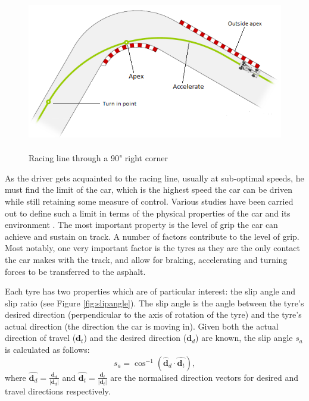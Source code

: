 \begin{figure}[!htb]
	\centering
	\includegraphics[height=7cm]{images/cornerraceline}
	\caption{Racing line through a 90" right corner}
	\label{fig:CornerRaceLine}
\end{figure}

As the driver gets acquainted to the racing line, usually at sub-optimal speeds, he must find the limit of the car, which is the highest speed the car can be driven while still retaining some measure of control. Various studies have been carried out to define such a limit in terms of the physical properties of the car and its environment \cite{beckman1991physics}. The most important property is the level of grip the car can achieve and sustain on track. A number of factors contribute to the level of grip. Most notably, one very important factor is the tyres as they are the only contact the car makes with the track, and allow for braking, accelerating and turning forces to be transferred to the asphalt. 

Each tyre has two properties which are of particular interest: the slip angle and slip ratio (see Figure \ref{fig:slipangle}). The slip angle is the angle between the tyre's desired direction (perpendicular to the axis of rotation of the tyre) and the tyre's actual direction (the direction the car is moving in). Given both the actual direction of travel ($\mathbf{d}_t$) and the desired direction ($\mathbf{d}_d$) are known, the slip angle $s_a$ is calculated as follows:
\begin{equation}
	s_a = \cos^{-1}(\hat{\mathbf{d}}_d \cdot \hat{\mathbf{d}_t}),
\end{equation}
\noindent where $\hat{\mathbf{d}_d} = \frac{\mathbf{d}_d}{|\mathbf{d}_d|}$ and $\hat{\mathbf{d}_t} = \frac{\mathbf{d}_t}{|\mathbf{d}_t|}$ are the normalised direction vectors for desired and travel directions respectively.

